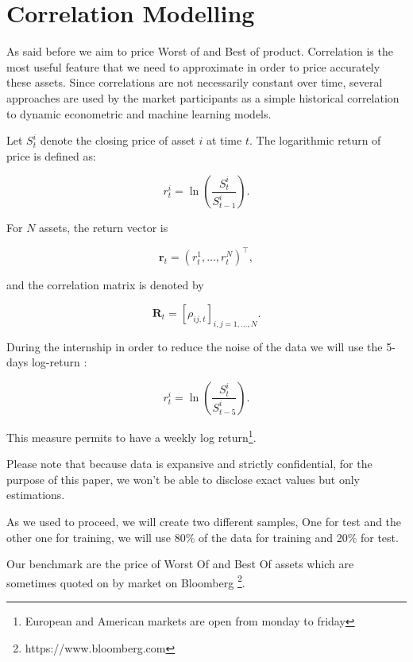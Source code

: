 \documentclass{article}
\begin{document}
\clearpage
\section{Correlation Modelling}

As said before we aim to price Worst of and Best of product. Correlation is the most useful feature that we need to approximate in order to price accurately these assets. Since correlations are not necessarily constant over time, several approaches are used by the market participants as a simple historical correlation  to dynamic econometric and machine learning models.

Let $S_t^i$ denote the closing price of asset $i$ at time $t$. The logarithmic return of price is defined as:

\begin{equation}
r_t^i
=
\ln\left(
\frac{S_t^i}{S_{t-1}^i}
\right).
\end{equation}

For $N$ assets, the return vector is

\begin{equation}
\bm{r}_t
=
\left(
r_t^1,\ldots,r_t^N
\right)^\top,
\end{equation}

and the correlation matrix is denoted by

\begin{equation}
\mathbf{R}_t
=
\left[
\rho_{ij,t}
\right]_{i,j=1,\ldots,N}.
\end{equation}

During the internship in order to reduce the noise of the data we will use the 5-days log-return :

\begin{equation}
r_t^i
=
\ln\left(
\frac{S_t^i}{S_{t-5}^i}
\right).
\end{equation}

This measure permits to have a weekly log return\footnote{European and American markets are open from monday to friday}.

Please note that because data is expansive and strictly confidential, for the purpose of this paper, we won't be able to disclose exact values but only estimations.

As we used to proceed, we will create two different samples, One for test and the other one for training, we will use 80\% of the data for training and 20\% for test.

Our benchmark are the price of Worst Of and Best Of assets which are sometimes quoted on by market on Bloomberg \footnote{https://www.bloomberg.com}. 
\end{document}
